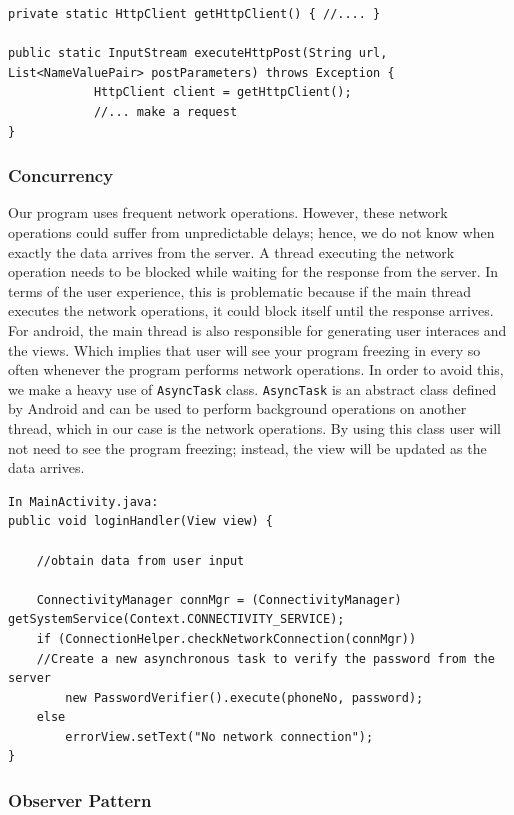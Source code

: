 \documentclass[a4paper,11pt]{article}
\begin{document}
\begin{verbatim}
private static HttpClient getHttpClient() { //.... }

public static InputStream executeHttpPost(String url, List<NameValuePair> postParameters) throws Exception {
            HttpClient client = getHttpClient();
            //... make a request
}  
\end{verbatim} 

\subsubsection*{Concurrency}

Our program uses frequent network operations. However, these network operations could suffer from unpredictable delays; hence, we do not know when exactly the data arrives from the server. A thread executing the network operation needs to be blocked while waiting for the response from the server. In terms of the user experience, this is problematic because if the main thread executes the network operations, it could block itself until the response arrives. For android, the main thread is also responsible for generating user interaces and the views. Which implies that user will see your program freezing in every so often whenever the program performs network operations. In order to avoid this, we make a heavy use of \texttt{AsyncTask} class. \texttt{AsyncTask} is an abstract class defined by Android and can be used to perform background operations on another thread, which in our case is the network operations. By using this class user will not need to see the program freezing; instead, the view will be updated as the data arrives.     
 
 \begin{verbatim}
In MainActivity.java:
public void loginHandler(View view) {

	//obtain data from user input

	ConnectivityManager connMgr = (ConnectivityManager) getSystemService(Context.CONNECTIVITY_SERVICE);
	if (ConnectionHelper.checkNetworkConnection(connMgr))
	//Create a new asynchronous task to verify the password from the server
		new PasswordVerifier().execute(phoneNo, password);
	else
		errorView.setText("No network connection");
}
 \end{verbatim}
 
\subsubsection*{Observer Pattern}
\end{document}
